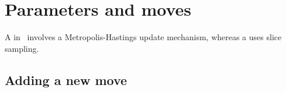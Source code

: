 \chapter{Parameters and moves} 

A  in \phycas\ involves a Metropolis-Hastings update mechanism, whereas a  uses slice sampling.

\section{Adding a new move}

